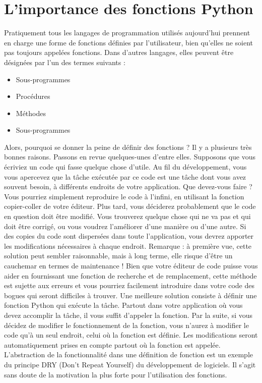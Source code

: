 \section{L'importance des fonctions Python}
Pratiquement tous les langages de programmation utilisés aujourd'hui prennent en charge une forme de fonctions définies par l'utilisateur, bien qu'elles ne soient pas toujours appelées fonctions. Dans d'autres langages, elles peuvent être désignées par l'un des termes suivants :
\begin{itemize}
\item Sous-programmes
\item Procédures
\item Méthodes
\item Sous-programmes
\end{itemize}
Alors, pourquoi se donner la peine de définir des fonctions ?  Il y a plusieurs très bonnes raisons. Passons en revue quelques-unes d'entre elles.
Supposons que vous écriviez un code qui fasse quelque chose d'utile. Au fil du développement, vous vous apercevez que la tâche exécutée par ce code est une tâche dont vous avez souvent besoin, à différents endroits de votre application. Que devez-vous faire ? Vous pourriez simplement reproduire le code à l'infini, en utilisant la fonction copier-coller de votre éditeur.
Plus tard, vous déciderez probablement que le code en question doit être modifié. Vous trouverez quelque chose qui ne va pas et qui doit être corrigé, ou vous voudrez l'améliorer d'une manière ou d'une autre. Si des copies du code sont dispersées dans toute l'application, vous devrez apporter les modifications nécessaires à chaque endroit.
Remarque : à première vue, cette solution peut sembler raisonnable, mais à long terme, elle risque d'être un cauchemar en termes de maintenance ! Bien que votre éditeur de code puisse vous aider en fournissant une fonction de recherche et de remplacement, cette méthode est sujette aux erreurs et vous pourriez facilement introduire dans votre code des bogues qui seront difficiles à trouver.
Une meilleure solution consiste à définir une fonction Python qui exécute la tâche.  Partout dans votre application où vous devez accomplir la tâche, il vous suffit d'appeler la fonction. Par la suite, si vous décidez de modifier le fonctionnement de la fonction, vous n'aurez à modifier le code qu'à un seul endroit, celui où la fonction est définie.  Les modifications seront automatiquement prises en compte partout où la fonction est appelée.
L'abstraction de la fonctionnalité dans une définition de fonction est un exemple du principe DRY (Don't Repeat Yourself) du développement de logiciels.  Il s'agit sans doute de la motivation la plus forte pour l'utilisation des fonctions.
